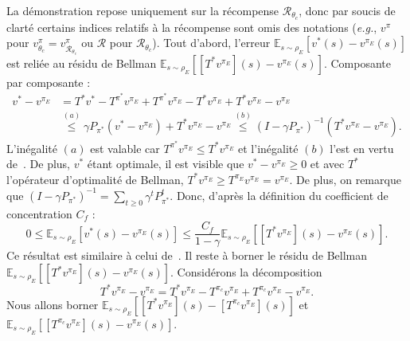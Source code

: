 \documentclass[french,utf8]{./hermes-journal}
\newcommand{\R}{\mathcal{R}}
\newcommand{\E}{\mathbb{E}}
\begin{document}
\begin{proof*}
  La démonstration repose uniquement sur la récompense $\R_{\theta_c}$, donc par soucis de clarté certains indices relatifs à la récompense sont omis des notations  
  (\textit{e.g.}, $v^\pi$ pour
  $v^\pi_{\theta_c}=v^\pi_{\R_{\theta_c}}$ ou $\R$ pour $\R_{\theta_c}$). Tout d'abord, l'erreur $\E_{s\sim\rho_E}[v^*(s)-v^{\pi_E}(s)]$ est reliée au résidu de Bellman $\E_{s\sim\rho_E}[[T^*v^{\pi_E}](s)-v^{\pi_E}(s)]$.
  Composante par composante :
  \begin{align}
    v^* - v^{\pi_E} &= T^* v^*  - T^{\pi^*}v^{\pi_E} +
    T^{\pi^*}v^{\pi_E} - T^* v^{\pi_E} + T^* v^{\pi_E} - v^{\pi_E}
    \\
    &\stackrel{(a)}{\leq} \gamma P_{\pi^*}(v^*-v^{\pi_E}) + T^*
    v^{\pi_E} - v^{\pi_E}
    \stackrel{(b)}{\leq} (I-\gamma
    P_{\pi^*})^{-1} (T^* v^{\pi_E} - v^{\pi_E}).
  \end{align}
  L'inégalité $(a)$ est valable car $T^{\pi^*} v^{\pi_E}\leq T^*
  v^{\pi_E}$ et l'inégalité $(b)$ l'est en vertu de~\cite[Lemme~4.2]{Muno007}. De plus, $v^*$ étant optimale, il est visible que  $v^*-v^{\pi_E}\geq 0$ et avec $T^*$ l'opérateur d'optimalité de Bellman, $T^* v^{\pi_E}\geq
  T^{\pi_E}v^{\pi_E}=v^{\pi_E}$. De plus, on remarque que 
  $(I-\gamma P_{\pi^*})^{-1} = \sum_{t\geq 0}\gamma^t P_{\pi^*}^t$.
  Donc, d'après la définition du coefficient de concentration 
  $C_f$ :
  \begin{equation}
    0\leq\E_{s\sim\rho_E}[v^*(s)-v^{\pi_E}(s)] \leq \frac{C_f}{1-\gamma}
    \E_{s\sim\rho_E}\left[[T^*v^{\pi_E}](s) - v^{\pi_E}(s)\right].
    \label{erooesidual}
  \end{equation}
  Ce résultat est similaire à celui de~\cite[Theoreme~4.2]{Muno007}. Il reste à borner le résidu de Bellman $\E_{s\sim\rho_E}[[T^*v^{\pi_E}](s) -
  v^{\pi_E}(s)]$. Considérons la décomposition
  \begin{equation}
    T^* v^{\pi_E} - v^{\pi_E} = T^* v^{\pi_E} - T^{\pi_c}v^{\pi_E}
    + T^{\pi_c}v^{\pi_E}- v^{\pi_E}.
    \label{erooecomposition}
  \end{equation}
  Nous allons borner  $\E_{s\sim\rho_E}[[T^* v^{\pi_E}](s) - [T^{\pi_c}v^{\pi_E}](s)]$
  et $\E_{s\sim\rho_E}[[T^{\pi_c}v^{\pi_E}](s) - v^{\pi_E}(s)]$.


\end{proof*}
\end{document}
